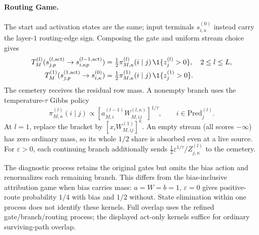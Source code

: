 \paragraph{Routing Game.}
The start and activation states are the same; input terminals $s^{(0)}_{i,\kappa}$ instead carry the layer-$1$ routing-edge sign. Composing the gate and uniform stream choice gives
\begin{align}
 T_M^{(l)}(s^{(l,\mathrm{act})}_{j,p}\to s^{(l-1,\mathrm{act})}_{i,\kappa p})
 &=\tfrac12\pi^{(l)}_{M,\kappa}(i\mid j)\,\1\{z_j^{(l)}>0\},\quad 2\le l\le L,\label{ptnb:eq:rg-T-act}\\
 T_M^{(1)}(s^{(1,\mathrm{act})}_{j,p}\to s^{(0)}_{i,\kappa})
 &=\tfrac12\pi^{(1)}_{M,\kappa}(i\mid j)\,\1\{z_j^{(1)}>0\}.\label{ptnb:eq:rg-T-pixel}
\end{align}
The cemetery receives the residual row mass. A nonempty branch uses the temperature-$\tau$ Gibbs policy
\begin{equation}\label{ptnb:eq:rg-T}
 \pi^{(l)}_{M,\kappa}(i\mid j)\propto
 [a^{(l-1)}_{M,i}W^{(l,\kappa)}_{M,ij}]^{1/\tau},\qquad i\in\mathrm{Pred}_j^{(l)}.
\end{equation}
At $l=1$, replace the bracket by $[x_iW^{(1)}_{M,ij}]^\kappa$. An empty stream (all scores $-\infty$) has zero ordinary mass, so its whole $1/2$ share is absorbed even at a live source. For $\varepsilon>0$, each continuing branch additionally sends $\tfrac12\varepsilon^{1/\tau}/Z^{(l)}_{j,\kappa}$ to the cemetery.

The diagnostic process retains the original gates but omits the bias action and renormalizes each remaining branch. This differs from the bias-inclusive attribution game when bias carries mass: $a=W=b=1$, $\varepsilon=0$ gives positive-route probability $1/4$ with bias and $1/2$ without. State elimination within one process does not identify these kernels. Full overlap uses the refined gate/branch/routing process; the displayed act-only kernels suffice for ordinary surviving-path overlap.

